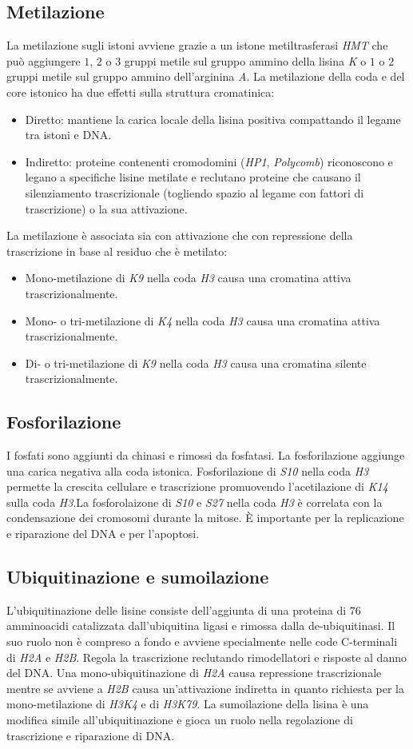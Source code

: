 \subsection{Metilazione}
La metilazione sugli istoni avviene grazie a un istone metiltrasferasi \emph{HMT} che pu\`o aggiungere $1$, $2$ o $3$ gruppi metile sul gruppo ammino della lisina \emph{K} o $1$ o $2$
gruppi metile sul gruppo ammino dell'arginina \emph{A}. La metilazione della coda e del core istonico ha due effetti sulla struttura cromatinica:
\begin{itemize}
	\item Diretto: mantiene la carica locale della lisina positiva compattando il legame tra istoni e DNA.
	\item Indiretto: proteine contenenti cromodomini (\emph{HP1}, \emph{Polycomb}) riconoscono e legano a specifiche lisine metilate e reclutano proteine che causano il silenziamento
		trascrizionale (togliendo spazio al legame con fattori di trascrizione) o la sua attivazione.
\end{itemize}
La metilazione \`e associata sia con attivazione che con repressione della trascrizione in base al residuo che \`e metilato:
\begin{itemize}
	\item Mono-metilazione di \emph{K9} nella coda \emph{H3} causa una cromatina attiva trascrizionalmente.
	\item Mono- o tri-metilazione di \emph{K4} nella coda \emph{H3} causa una cromatina attiva trascrizionalmente.
	\item Di- o tri-metilazione di \emph{K9} nella coda \emph{H3} causa una cromatina silente trascrizionalmente.
\end{itemize}
\subsection{Fosforilazione}
I fosfati sono aggiunti da chinasi e rimossi da fosfatasi. La fosforilazione aggiunge una carica negativa alla coda istonica. Fosforilazione di \emph{S10} nella coda \emph{H3} permette
la crescita cellulare e trascrizione promuovendo l'acetilazione di \emph{K14} sulla coda \emph{H3}.La fosforolaizone di \emph{S10} e \emph{S27} nella coda \emph{H3} \`e correlata con
la condensazione dei cromosomi durante la mitose. \`E importante per la replicazione e riparazione del DNA e per l'apoptosi. 
\subsection{Ubiquitinazione e sumoilazione}
L'ubiquitinazione delle lisine consiste dell'aggiunta di una proteina di $76$ amminoacidi catalizzata dall'ubiquitina ligasi e rimossa dalla de-ubiquitinasi. Il suo ruolo non \`e 
compreso a fondo e avviene specialmente nelle code C-terminali di \emph{H2A} e \emph{H2B}. Regola la trascrizione reclutando rimodellatori e risposte al danno del DNA. Una 
mono-ubiquitinazione di \emph{H2A} causa repressione trascrizionale mentre se avviene a \emph{H2B} causa un'attivazione indiretta in quanto richiesta per la mono-metilazione di 
\emph{H3K4} e di \emph{H3K79}. La sumoilazione della lisina \`e una modifica simile all'ubiquitinazione e gioca un ruolo nella regolazione di trascrizione e riparazione di DNA.

